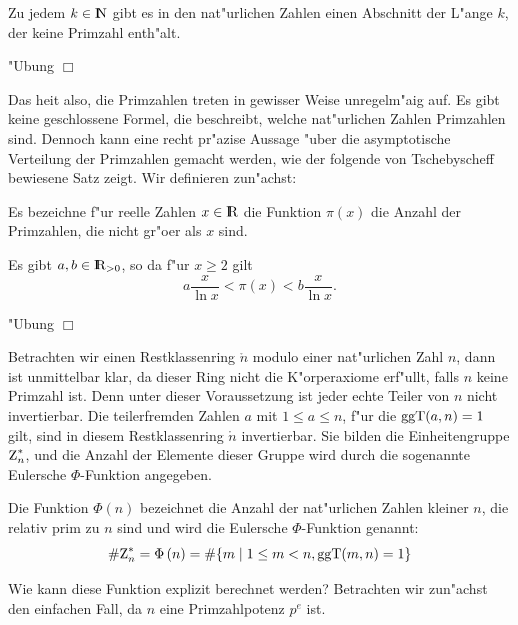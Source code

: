 \begin{satz}
Zu jedem $k \in \N$ gibt es in den nat"urlichen Zahlen einen Abschnitt
der L"ange $k$, der keine Primzahl enth"alt.
\end{satz}

\beweis "Ubung \hfill $\Box$

Das hei\3t also, die Primzahlen treten in gewisser Weise
unregelm"a\3ig auf. Es gibt keine geschlossene Formel, die beschreibt,
welche nat"urlichen Zahlen Primzahlen sind. Dennoch kann eine recht
pr"azise Aussage "uber die asymptotische Verteilung der Primzahlen
gemacht werden, wie der folgende von Tschebyscheff bewiesene Satz
zeigt. Wir definieren zun"achst:

\begin{definition}
Es bezeichne f"ur reelle Zahlen $x\in\R$ die Funktion $\pi(x)$ die
Anzahl der Primzahlen, die nicht gr"o\3er als $x$ sind.
\end{definition}
\begin{satz}[Tschebyscheff] 
Es gibt $a,b \in \R_{>0}$, so da\3 f"ur $x\ge 2$ gilt
\begin{equation}
  a\frac{x}{\ln x} < \pi(x) < b\frac{x}{\ln x}.
\end{equation}
\end{satz}

\beweis "Ubung \hfill $\Box$

Betrachten wir einen Restklassenring $\ring{n}$ modulo einer nat"urlichen
Zahl $n$, dann ist unmittelbar klar, da\3 dieser Ring nicht die
K"orperaxiome erf"ullt, falls $n$ keine Primzahl ist. Denn unter
dieser Voraussetzung ist jeder echte Teiler von $n$ nicht
invertierbar. Die teilerfremden Zahlen $a$ mit $1 \le a \le n$, f"ur
die $\mbox{ggT}(a,n)=1$ gilt, sind in diesem Restklassenring $\ring{n}$
invertierbar. Sie bilden die Einheitengruppe $\einheit{n}$, und die
Anzahl der Elemente dieser Gruppe wird durch die sogenannte Eulersche
$\Phi$-Funktion angegeben.

\begin{definition} 
  Die Funktion $\Phi(n)$ bezeichnet die Anzahl der nat"urlichen Zahlen 
  kleiner $n$, die relativ prim zu $n$ sind
  und wird die Eulersche $\Phi$-Funktion genannt:
  $$ \#\einheit{n} = \euler{n} = \#\{ m \mid 1 \le m < n, \ggt
(m,n)=1\} $$
\end{definition}   

Wie kann diese Funktion explizit berechnet werden? Betrachten wir
zun"achst den einfachen Fall, da\3 $n$ eine Primzahlpotenz $p^e$ ist.

